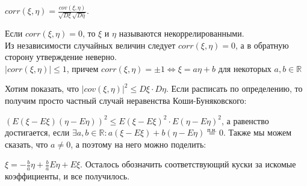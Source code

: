 $corr(\xi, \eta) = \frac{cov(\xi, \eta)}{\sqrt{D\xi}\sqrt{D\eta}}$.

Если $corr(\xi, \eta) = 0$, то $\xi$ и $\eta$ называются некоррелированными.\\

\Note Из независимости случайных величин следует $corr(\xi, \eta) = 0$, а в обратную сторону утверждение неверно.\\

\Statement $|corr(\xi, \eta)| \leq 1$, причем $corr(\xi, \eta) = \pm 1 \Longleftrightarrow \xi = a\eta + b$ для некоторых $a, b \in \mathbb{R}$

\Proof
Хотим показать, что $|cov(\xi, \eta)|^2 \leq D\xi \cdot D\eta$. Если расписать по определению, то получим просто частный случай неравенства Коши-Буняковского:

$(E(\xi - E\xi)(\eta - E\eta))^2 \leq E(\xi - E\xi)^2 \cdot E(\eta - E\eta)^2$, а равенство достигается, если $\exists a, b \in \mathbb{R} : a(\xi - E\xi) + b(\eta - E\eta) \stackrel{\mbox{п.н.}}{=} 0$. Также мы можем сказать, что $a \neq 0$, а поэтому на него можно поделить:

$\xi = -\frac{b}{a}\eta + \frac{b}{a}E\eta + E\xi$. Осталось обозначить соответствующий куски за искомые коэффициенты, и все получилось.
\EndProof



